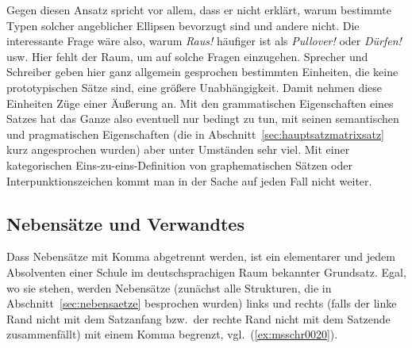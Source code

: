 \begin{exe}
  \ex\label{ex:msschr7772}
  \begin{xlist}
  \end{xlist}
\end{exe}

Gegen diesen Ansatz spricht vor allem, dass er nicht erklärt, warum bestimmte Typen solcher angeblicher Ellipsen bevorzugt sind und andere nicht.
Die interessante Frage wäre also, warum \textit{Raus!} häufiger ist als \textit{Pullover!} oder \textit{Dürfen!} usw.
Hier fehlt der Raum, um auf solche Fragen einzugehen.
Sprecher und Schreiber geben hier ganz allgemein gesprochen bestimmten Einheiten, die keine prototypischen Sätze sind, eine größere Unabhängigkeit.
Damit nehmen diese Einheiten Züge einer Äußerung an.
Mit den grammatischen Eigenschaften eines Satzes hat das Ganze also eventuell nur bedingt zu tun, mit seinen semantischen und pragmatischen Eigenschaften (die in Abschnitt~\ref{sec:hauptsatzmatrixsatz} kurz angesprochen wurden) aber unter Umständen sehr viel.
Mit einer kategorischen Eins-zu-eins-Definition von graphematischen Sätzen oder Interpunktionszeichen kommt man in der Sache auf jeden Fall nicht weiter.

\subsection{Nebensätze und Verwandtes}

\label{sec:nebensatzschreib}

Dass Nebensätze mit Komma abgetrennt werden, ist ein elementarer und jedem Absolventen einer Schule im deutschsprachigen Raum bekannter Grundsatz.
Egal, wo sie stehen, werden Nebensätze (zunächst alle Strukturen, die in Abschnitt~\ref{sec:nebensaetze} besprochen wurden) links und rechts (falls der linke Rand nicht mit dem Satzanfang bzw.\ der rechte Rand nicht mit dem Satzende zusammenfällt) mit einem Komma begrenzt, vgl.\ (\ref{ex:msschr0020}).

\begin{exe}
  \ex\label{ex:msschr0020} 
  \begin{xlist}
  \end{xlist}
\end{exe}

